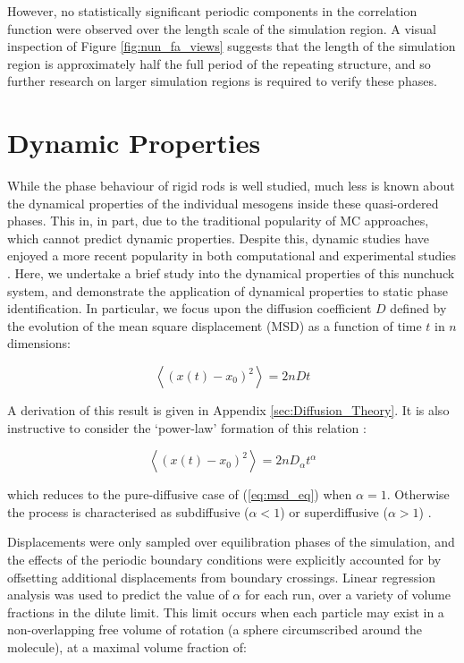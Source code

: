 \documentclass[11pt, a4paper]{article} %
\begin{document}
However, no statistically significant periodic components in the correlation function were observed over the length scale of the simulation region. A visual inspection of Figure \ref{fig:nun_fa_views} suggests that the length of the simulation region is approximately half the full period of the repeating structure, and so further research on larger simulation regions is required to verify these phases.




\section{Dynamic Properties} \label{sec:Dynamics}
While the phase behaviour of rigid rods is well studied, much less is known about the dynamical properties of the individual mesogens inside these quasi-ordered phases. This in, in part, due to the traditional popularity of MC approaches, which cannot predict dynamic properties. Despite this, dynamic studies have enjoyed a more recent popularity in both computational and experimental studies \cite{GayBalmaz2013, Zhao2013, Rey2013}. Here, we undertake a brief study into the dynamical properties of this nunchuck system, and demonstrate the application of dynamical properties to static phase identification. In particular, we focus upon the diffusion coefficient $D$ defined by the evolution of the mean square displacement (MSD) as a function of time $t$ in $n$ dimensions:

\begin{equation} \label{eq:msd_eq} 
\left\langle \left(x(t) - x_{0}\right)^{2} \right\rangle = 2nDt
\end{equation}

A derivation of this result is given in Appendix \ref{sec:Diffusion_Theory}. It is also instructive to consider the `power-law' formation of this relation \cite{Ernst2013}: 

\begin{equation}
\left\langle \left(x(t) - x_{0}\right)^{2} \right\rangle = 2nD_{\alpha}t^{\alpha}
\end{equation}

which reduces to the pure-diffusive case of (\ref{eq:msd_eq}) when $\alpha=1$. Otherwise the process is characterised as subdiffusive ($\alpha < 1$) or superdiffusive ($\alpha > 1$) \cite{Metzler2000}. 

Displacements were only sampled over equilibration phases of the simulation, and the effects of the periodic boundary conditions were explicitly accounted for by offsetting additional displacements from boundary crossings. Linear regression analysis was used to predict the value of $\alpha$ for each run, over a variety of volume fractions in the dilute limit. This limit occurs when each particle may exist in a non-overlapping free volume of rotation (a sphere circumscribed around the molecule), at a maximal volume fraction of:
\end{document}
